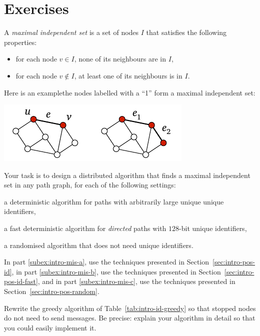 \section{Exercises}

\begin{ex}\label{ex:intro-mis}
    A \emph{maximal independent set} is a set of nodes $I$ that satisfies the following properties:
    \begin{itemize}[noitemsep]
        \item for each node $v \in I$, none of its neighbours are in $I$,
        \item for each node $v \notin I$, at least one of its neighbours is in $I$.
    \end{itemize}
    Here is an example\mydash the nodes labelled with a ``1'' form a maximal independent set:
    \begin{center}
        \includegraphics[page=\PIntroMis]{figs.pdf}
    \end{center}
    Your task is to design a distributed algorithm that finds a maximal independent set in any path graph, for each of the following settings:
    \begin{subex}
        \item\label{subex:intro-mis-a} a deterministic algorithm for paths with arbitrarily large unique unique identifiers,
        \item\label{subex:intro-mis-b} a fast deterministic algorithm for \emph{directed} paths with $128$-bit unique identifiers,
        \item\label{subex:intro-mis-c} a randomised algorithm that does not need unique identifiers. 
    \end{subex}
    In part \ref{subex:intro-mis-a}, use the techniques presented in Section~\ref{sec:intro-pos-id},
    in part \ref{subex:intro-mis-b}, use the techniques presented in Section~\ref{sec:intro-pos-id-fast}, and
    in part \ref{subex:intro-mis-c}, use the techniques presented in Section~\ref{sec:intro-pos-random}.
\end{ex}

\begin{ex}\label{ex:intro-stopped}
    Rewrite the greedy algorithm of Table~\ref{tab:intro-id-greedy} so that stopped nodes do not need to send messages. Be precise: explain your algorithm in detail so that you could easily implement it.
\end{ex}

